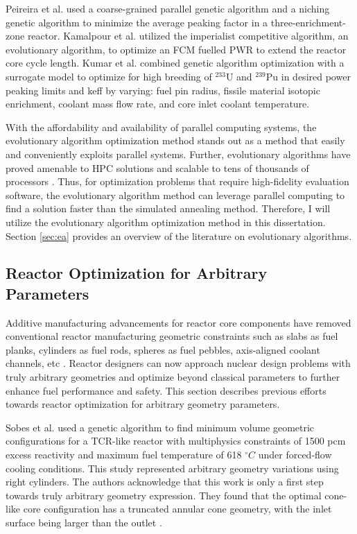 Peireira et al. \cite{pereira_coarse-grained_2003,pereira_parallel_2008} 
used a coarse-grained parallel genetic algorithm and a niching genetic algorithm
to minimize the average peaking factor in a three-enrichment-zone reactor. 
Kamalpour et al. \cite{kamalpour_smart_2020} utilized the imperialist competitive 
algorithm, an evolutionary algorithm, to optimize an \gls{FCM} fuelled 
\gls{PWR} to extend the reactor core cycle length. 
Kumar et al. \cite{kumar_new_2015} combined genetic algorithm optimization 
with a surrogate model to optimize for high breeding of $^{233}$U and $^{239}$Pu 
in desired power peaking limits and keff by varying: fuel pin 
radius,  fissile material isotopic enrichment, coolant mass flow rate, and 
core inlet coolant temperature.

With the affordability and availability of parallel computing systems, the 
evolutionary algorithm optimization method stands out as a method 
that easily and conveniently exploits parallel systems. 
Further, evolutionary algorithms have proved amenable to \gls{HPC} solutions and 
scalable to tens of thousands of processors \cite{kropaczek_constraint_2019}. 
Thus, for optimization problems that require high-fidelity evaluation software, 
the evolutionary algorithm method can leverage parallel computing to find a 
solution faster than the simulated annealing method.
Therefore, I will utilize the evolutionary algorithm optimization method in 
this dissertation.
Section \ref{sec:ea} provides an overview of the literature on evolutionary algorithms.

\subsection{Reactor Optimization for Arbitrary Parameters}
\label{sec:lit-review-reactor-arbitrary}
Additive manufacturing advancements for reactor core components have
removed conventional reactor manufacturing geometric constraints such as slabs as fuel 
planks, cylinders as fuel rods, spheres as fuel pebbles, axis-aligned coolant 
channels, etc \cite{sobes_artificial_2020}.
Reactor designers can now approach nuclear design problems with truly 
arbitrary geometries and optimize beyond classical parameters to further enhance 
fuel performance and safety.
This section describes previous efforts towards reactor optimization for arbitrary 
geometry parameters. 

Sobes et al. \cite{sobes_artificial_2020} used a genetic algorithm to find 
minimum volume geometric configurations for a \gls{TCR}-like reactor with 
multiphysics constraints of 1500 pcm excess reactivity and maximum fuel 
temperature of 618 $^{\circ}C$ under forced-flow cooling conditions. 
This study represented arbitrary geometry variations using right cylinders.
The authors acknowledge that this work is only a first step towards truly 
arbitrary geometry expression. 
They found that the optimal cone-like core configuration has a truncated annular 
cone geometry, with the inlet surface being larger than the outlet 
\cite{sobes_artificial_2020}.

